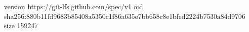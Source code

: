 version https://git-lfs.github.com/spec/v1
oid sha256:880b11fd9683b85408a5350c1f86a635e7bb658c8e1bfed2224b7530a84d9706
size 159247
